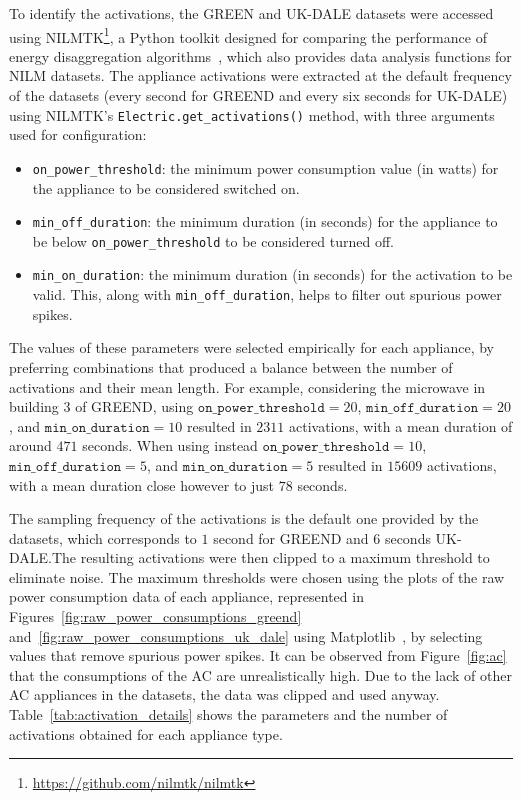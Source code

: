To identify the activations, the GREEN and UK-DALE datasets were accessed using NILMTK\footnote{\url{https://github.com/nilmtk/nilmtk}}, a Python toolkit designed for comparing the performance of energy disaggregation algorithms~\parencite{batraItDifferentInsights2013}, which also provides data analysis functions for NILM datasets. The appliance activations were extracted at the default frequency of the datasets (every second for GREEND and every six seconds for UK-DALE) using NILMTK's \texttt{Electric.get\_activations()} method, with three arguments used for configuration:
\begin{itemize}
  \item \texttt{on\_power\_threshold}: the minimum power consumption value (in watts) for the appliance to be considered switched on.
  \item \texttt{min\_off\_duration}: the minimum duration (in seconds) for the appliance to be below \texttt{on\_power\_threshold} to be considered turned off.
  \item \texttt{min\_on\_duration}: the minimum duration (in seconds) for the activation to be valid. This, along with \texttt{min\_off\_duration}, helps to filter out spurious power spikes.
\end{itemize}
The values of these parameters were selected empirically for each appliance, by preferring combinations that produced a balance between the number of activations and their mean length. For example, considering the microwave in building 3 of GREEND, using \(\texttt{on\_power\_threshold} = 20\), \(\texttt{min\_off\_duration} = 20\), and \(\texttt{min\_on\_duration} = 10\) resulted in \(2311\) activations, with a mean duration of around \(471\) seconds. When using instead \(\texttt{on\_power\_threshold} = 10\), \(\texttt{min\_off\_duration} = 5\), and \(\texttt{min\_on\_duration} = 5\) resulted in \(15609\) activations, with a mean duration close however to just \(78\) seconds.

The sampling frequency of the activations is the default one provided by the datasets, which corresponds to \(1\) second for GREEND and \(6\) seconds UK-DALE.\@ The resulting activations were then clipped to a maximum threshold to eliminate noise. The maximum thresholds were chosen using the plots of the raw power consumption data of each appliance, represented in Figures~\ref{fig:raw_power_consumptions_greend} and~\ref{fig:raw_power_consumptions_uk_dale} using Matplotlib~\parencite{hunterMatplotlib2DGraphics2007}, by selecting values that remove spurious power spikes. It can be observed from Figure~\ref{fig:ac} that the consumptions of the AC are unrealistically high. Due to the lack of other AC appliances in the datasets, the data was clipped and used anyway. Table~\ref{tab:activation_details} shows the parameters and the number of activations obtained for each appliance type.

